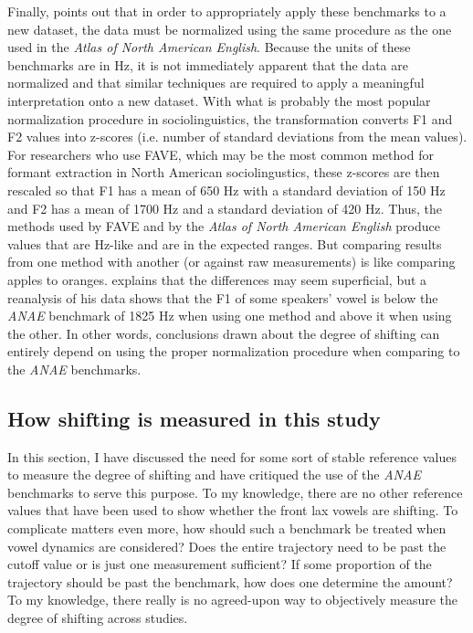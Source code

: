 Finally, \citet{dinkin_2018} points out that in order to appropriately apply these benchmarks to a new dataset, the data must be normalized using the same procedure as the one used in the \textit{Atlas of North American English}. Because the units of these benchmarks are in Hz, it is not immediately apparent that the data are normalized and that similar techniques are required to apply a meaningful interpretation onto a new dataset. With what is probably the most popular normalization procedure in sociolinguistics, the \citet{lobanov_1971} transformation converts F1 and F2 values into z-scores (i.e. number of standard deviations from the mean values). For researchers who use FAVE, which may be the most common method for formant extraction in North American sociolingustics, these z-scores are then rescaled so that F1 has a mean of 650 Hz with a standard deviation of 150 Hz and F2 has a mean of 1700 Hz and a standard deviation of 420 Hz. Thus, the methods used by FAVE and by the \textit{Atlas of North American English} produce values that are Hz-like and are in the expected ranges. But comparing results from one method with another (or against raw measurements) is like comparing apples to oranges. \citet{dinkin_2018} explains that the differences may seem superficial, but a reanalysis of his data shows that the F1 of some speakers’ \trap vowel is below the \textit{ANAE} benchmark of 1825 Hz when using one method and above it when using the other. In other words, conclusions drawn about the degree of shifting can entirely depend on using the proper normalization procedure when comparing to the \textit{ANAE} benchmarks.

\subsection{How shifting is measured in this study}

In this section, I have discussed the need for some sort of stable reference values to measure the degree of shifting and have critiqued the use of the \textit{ANAE} benchmarks to serve this purpose. To my knowledge, there are no other reference values that have been used to show whether the front lax vowels are shifting. To complicate matters even more, how should such a benchmark be treated when vowel dynamics are considered? Does the entire trajectory need to be past the cutoff value or is just one measurement sufficient? If some proportion of the trajectory should be past the benchmark, how does one determine the amount? To my knowledge, there really is no agreed-upon way to objectively measure the degree of shifting across studies.

